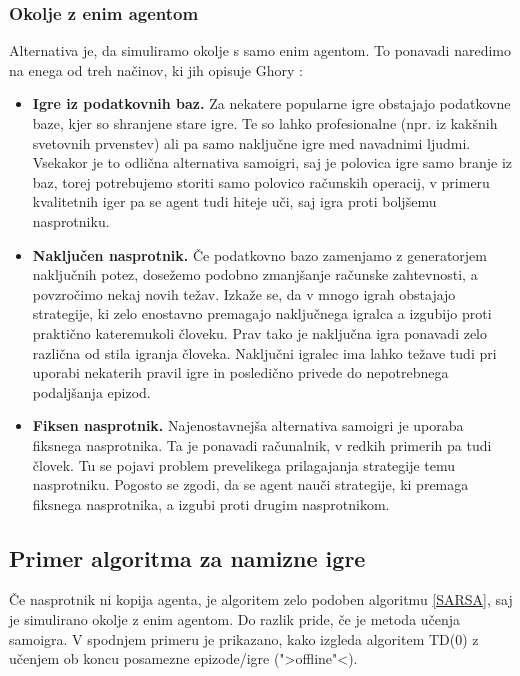 \documentclass[12pt,a4paper]{amsart}
\theoremstyle{definition} %
\theoremstyle{plain} %
\begin{document}
\subsubsection{Okolje z enim agentom}
Alternativa je, da simuliramo okolje s samo enim agentom. To ponavadi naredimo na enega od treh 
načinov, ki jih opisuje Ghory \cite{RLboard}:
\begin{itemize}
    \item \textbf{Igre iz podatkovnih baz.} Za nekatere popularne igre obstajajo podatkovne baze, 
            kjer so shranjene stare igre. Te so lahko profesionalne (npr. iz kakšnih svetovnih
            prvenstev) ali pa samo naključne igre med navadnimi ljudmi. Vsekakor je to odlična 
            alternativa samoigri, saj je polovica igre samo branje iz baz, torej potrebujemo storiti 
            samo polovico računskih operacij, v primeru kvalitetnih iger pa se agent tudi hiteje uči, 
            saj igra proti boljšemu nasprotniku.
    \item \textbf{Naključen nasprotnik.} Če podatkovno bazo zamenjamo z generatorjem naključnih potez, 
            dosežemo podobno zmanjšanje računske zahtevnosti, a povzročimo nekaj novih težav. Izkaže 
            se, da v mnogo igrah obstajajo strategije, ki zelo enostavno premagajo naključnega igralca 
            a izgubijo proti praktično kateremukoli človeku. Prav tako je naključna igra ponavadi zelo 
            različna od stila igranja človeka. Naključni igralec ima lahko težave tudi pri uporabi 
            nekaterih pravil igre in posledično privede do nepotrebnega podaljšanja epizod.
    \item \textbf{Fiksen nasprotnik.} Najenostavnejša alternativa samoigri je uporaba fiksnega 
            nasprotnika. Ta je ponavadi računalnik, v redkih primerih pa tudi človek. Tu se pojavi 
            problem prevelikega prilagajanja strategije temu nasprotniku. Pogosto se zgodi, da se 
            agent nauči strategije, ki premaga fiksnega nasprotnika, a izgubi proti drugim 
            nasprotnikom.
\end{itemize}

\subsection{Primer algoritma za namizne igre}
Če nasprotnik ni kopija agenta, je algoritem zelo podoben algoritmu \ref{SARSA}, saj je simulirano 
okolje z enim agentom. Do razlik pride, če je metoda učenja samoigra. V spodnjem primeru je prikazano, 
kako izgleda algoritem TD($0$) z učenjem ob koncu posamezne epizode/igre (">offline"<).
\end{document}
